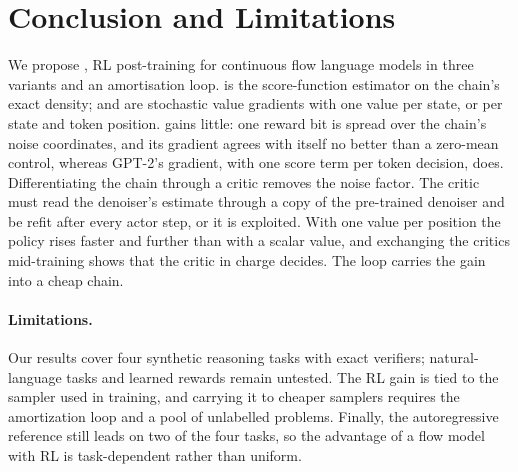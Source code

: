 \section{Conclusion and Limitations}
We propose \method{}, RL post-training for continuous flow language models in three variants and an amortisation loop. \methodGRPO{} is the score-function estimator on the chain's exact density; \methodSVGScalar{} and \methodSVGTwoD{} are stochastic value gradients with one value per state, or per state and token position. \methodGRPO{} gains little: one reward bit is spread over the chain's noise coordinates, and its gradient agrees with itself no better than a zero-mean control, whereas GPT-2's gradient, with one score term per token decision, does. Differentiating the chain through a critic removes the noise factor. The critic must read the denoiser's estimate through a copy of the pre-trained denoiser and be refit after every actor step, or it is exploited. With one value per position the policy rises faster and further than with a scalar value, and exchanging the critics mid-training shows that the critic in charge decides. The loop carries the gain into a cheap chain.

\paragraph{Limitations.}
Our results cover four synthetic reasoning tasks with exact verifiers; natural-language tasks and learned rewards remain untested. The RL gain is tied to the sampler used in training, and carrying it to cheaper samplers requires the amortization loop and a pool of unlabelled problems. Finally, the autoregressive reference still leads on two of the four tasks, so the advantage of a flow model with RL is task-dependent rather than uniform.
